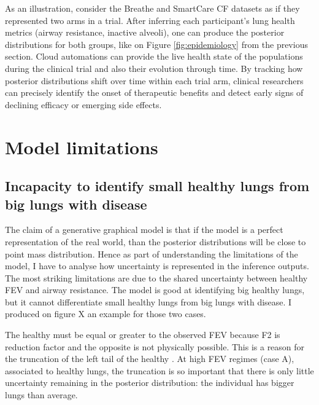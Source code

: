 As an illustration, consider the Breathe and SmartCare CF datasets as if they represented two arms in a trial. After inferring each participant’s lung health metrics (airway resistance, inactive alveoli), one can produce the posterior distributions for both groups, like on Figure \ref{fig:epidemiology} from the previous section. Cloud automations can provide the live health state of the populations during the clinical trial and also their evolution through time. By tracking how posterior distributions shift over time within each trial arm, clinical researchers can precisely identify the onset of therapeutic benefits and detect early signs of declining efficacy or emerging side effects.


\section{Model limitations}

\subsection{Incapacity to identify small healthy lungs from big lungs with disease}
The claim of a generative graphical model is that if the model is a perfect representation of the real world, than the posterior distributions will be close to point mass distribution. Hence as part of understanding the limitations of the model, I have to analyse how uncertainty is represented in the inference outputs. The most striking limitations are due to the shared uncertainty between healthy FEV and airway resistance. The model is good at identifying big healthy lungs, but it cannot differentiate small healthy lungs from big lungs with disease. I produced on figure X an example for those two cases.

The healthy \F must be equal or greater to the observed FEV because F2 is reduction factor and the opposite is not physically possible. This is a reason for the truncation of the left tail of the healthy \F. At high FEV regimes (case A), associated to healthy lungs, the truncation is so important that there is only little uncertainty remaining in the posterior distribution: the individual has bigger lungs than average.

